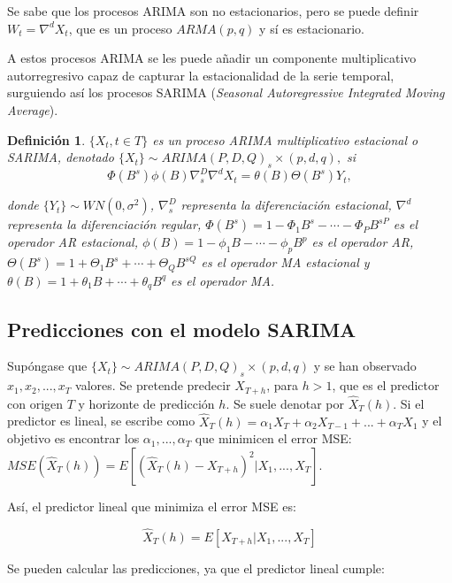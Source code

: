 \documentclass[12pt,twoside]{article}
\newtheorem{definition}[theorem]{Definición}
\begin{document}
Se sabe que los procesos ARIMA son no estacionarios, pero se puede definir $W_t = \nabla^dX_t$, que es un proceso $ARMA(p,q)$ y sí es estacionario.

A estos procesos ARIMA se les puede añadir un componente multiplicativo autorregresivo capaz de capturar la estacionalidad de la serie temporal, surguiendo así los procesos SARIMA (\textit{Seasonal Autoregressive Integrated Moving Average}).

\begin{definition}
$\{X_t, t \in T\}$ es un proceso ARIMA multiplicativo estacional o SARIMA, denotado $\{X_t\} \sim ARIMA(P,D,Q)_s \times (p,d,q),$ si
\begin{equation}
\Phi(B^s)\phi(B)\nabla_s^D \nabla^d X_t = \theta(B)\Theta(B^s)Y_t,
\end{equation}

donde $\{Y_t\} \sim WN(0, \sigma^2)$, $\nabla_s^D$ representa la diferenciación estacional, $\nabla^d$ representa la diferenciación regular, $\Phi(B^s) = 1 - \Phi_1 B^s - \cdots - \Phi_P B^{sP}$ es el operador AR estacional, $\phi(B) = 1 - \phi_1 B - \cdots - \phi_p B^p$ es el operador AR, $\Theta(B^s) = 1 + \Theta_1 B^s + \cdots + \Theta_Q B^{sQ}$ es el operador MA estacional y $\theta(B) = 1 + \theta_1 B + \cdots + \theta_q B^q$ es el operador MA.
\end{definition}


\subsection{Predicciones con el modelo SARIMA}\label{sec:35}
Supóngase que $\{X_t\}\sim ARIMA(P,D,Q)_s \times (p,d,q)$ y se han observado $x_1, x_2, ..., x_T$ valores. Se pretende predecir $X_{T+h}$, para $h>1$, que es el predictor con origen $T$ y horizonte de predicción $h$. Se suele denotar por $\hat{X}_T(h)$. Si el predictor es lineal, se escribe como $\hat{X}_T(h) = \alpha_1X_T+\alpha_2X_{T-1}+...+\alpha_TX_1$ y el objetivo es encontrar los $\alpha_1,...,\alpha_T$ que minimicen el error MSE: $MSE(\hat{X}_T(h))=E[(\hat{X}_T(h)-X_{T+h})^2|X_1,...,X_T]$.

Así, el predictor lineal que minimiza el error MSE es:

\begin{equation}
\hat{X}_T(h) = E[X_{T+h}|X_1,...,X_T] 
\end{equation}

Se pueden calcular las predicciones, ya que el predictor lineal cumple:
\end{document}
